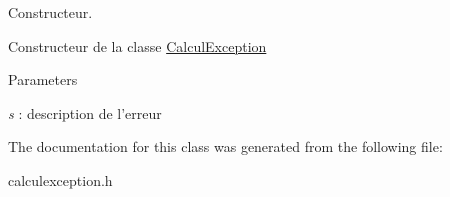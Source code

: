 Constructeur. 

Constructeur de la classe \hyperlink{classCalculException}{CalculException}


\begin{DoxyParams}{Parameters}
\item[{\em s}]: description de l'erreur \end{DoxyParams}


The documentation for this class was generated from the following file:\begin{DoxyCompactItemize}
\item 
calculexception.h\end{DoxyCompactItemize}

